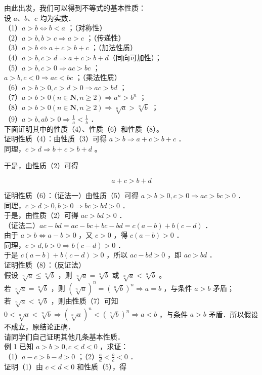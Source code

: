 \documentclass[10pt]{article}
\begin{document}
由此出发，我们可以得到不等式的基本性质：\\
设 \(a 、 b 、 c\) 均为实数．\\
（1）\(a>b \Leftrightarrow b<a\) ；（对称性）\\
（2）\(a>b, b>c \Rightarrow a>c\) ；（传递性）\\
（3）\(a>b \Leftrightarrow a+c>b+c\) ；（加法性质）\\
（4）\(a>b, c>d \Rightarrow a+c>b+d\)（同向可加性）；\\
（5）\(a>b, c>0 \Rightarrow a c>b c\) ；\\
\(a>b, c<0 \Rightarrow a c<b c\) ；（乘法性质）\\
（6）\(a>b>0, c>d>0 \Rightarrow a c>b d\) ；\\
（7）\(a>b>0(n \in \mathbf{N}, n \geqslant 2) \Rightarrow a^{n}>b^{n}\) ；\\
（8）\(a>b>0(n \in \mathbf{N}, n \geqslant 2) \Rightarrow \sqrt[n]{a}>\sqrt[n]{b}\) ；\\
（9）\(a>b, a b>0 \Rightarrow \frac{1}{a}<\frac{1}{b}\) ．\\
下面证明其中的性质（4）、性质（6）和性质（8）。\\
证明性质（4）：由性质（3）可得 \(a>b \Rightarrow a+c>b+c\) ．\\
同理，\(c>d \Rightarrow b+c>b+d\) 。

于是，由性质（2）可得

\[
a+c>b+d
\]

证明性质（6）：（证法一）由性质（5）可得 \(a>b>0, c>0 \Rightarrow a c>b c>0\) ．\\
同理，\(c>d>0, b>0 \Rightarrow b c>b d>0\) ．\\
于是，由性质（2）可得 \(a c>b d>0\) ．\\
（证法二）\(a c-b d=a c-b c+b c-b d=c(a-b)+b(c-d)\) ．\\
由于 \(a>b \Leftrightarrow a-b>0\) ，又 \(c>0\) ，得 \(c(a-b)>0\) ．\\
同理，\(c>d, b>0 \Rightarrow b(c-d)>0\) ．\\
于是 \(c(a-b)+b(c-d)>0\) ，所以 \(a c-b d>0\) ，即 \(a c>b d\) ．\\
证明性质（8）：（反证法）\\
假设 \(\sqrt[n]{a} \leqslant \sqrt[n]{b}\) ，则 \(\sqrt[n]{a}=\sqrt[n]{b}\) 或 \(\sqrt[n]{a}<\sqrt[n]{b}\) 。\\
若 \(\sqrt[n]{a}=\sqrt[n]{b}\) ，则 \((\sqrt[n]{a})^{n}=(\sqrt[n]{b})^{n} \Rightarrow a=b\) ，与条件 \(a>b\) 矛盾；\\
若 \(\sqrt[n]{a}<\sqrt[n]{b}\) ，则由性质（7）可知 \(0<\sqrt[n]{a}<\sqrt[n]{b} \Rightarrow(\sqrt[n]{a})^{n}<(\sqrt[n]{b})^{n} \Rightarrow a<b\) ，与条件 \(a>b\) 矛盾．所以假设不成立，原结论正确．\\
请同学们自己证明其他几条基本性质．\\
例 1 已知 \(a>b>0, c<d<0\) ，求证：\\
（1）\(a-c>b-d>0\) ；（2）\(\frac{a}{d}<\frac{b}{c}<0\) ．\\
证明（1）由 \(c<d<0\) 和性质（5），得
\end{document}
